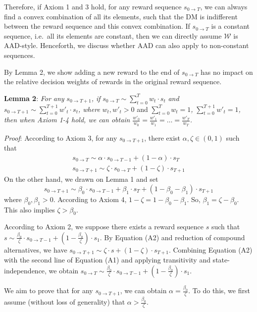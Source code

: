 \documentclass[
  12pt,
]{article}
\begin{document}
Therefore, if Axiom 1 and 3 hold, for any reward sequence
\(s_{0\rightarrow T}\), we can always find a convex combination of all
its elements, such that the DM is indifferent between the reward
sequence and this convex combination. If \(s_{0\rightarrow T}\) is a
constant sequence, i.e.~all its elements are constant, then we can
directly assume \(\mathcal{W}\) is AAD-style. Henceforth, we discuss
whether AAD can also apply to non-constant sequences.

By Lemma 2, we show adding a new reward to the end of
\(s_{0\rightarrow T}\) has no impact on the relative decision weights of
rewards in the original reward sequence.

\noindent \textbf{Lemma 2}: \emph{For any}
\(s_{0\rightarrow T+1}\)\emph{, if}
\(s_{0\rightarrow T}\sim \sum_{t=0}^T w_t \cdot s_t\) \emph{and}
\(s_{0\rightarrow T+1} \sim \sum_{t=0}^{T+1} w'_t\cdot s_t\)\emph{,
where} \(w_t, w'_t>0\) and \(\sum_{t=0}^Tw_t=1\)\emph{,}
\(\sum_{t=0}^{T+1}w'_t=1\)\emph{, then when Axiom 1-4 hold, we can
obtain} \(\frac{w'_0}{w_0}=\frac{w'_1}{w_1}=…=\frac{w'_T}{w_T}\)\emph{.}

\noindent \emph{Proof}: According to Axiom 3, for any
\(s_{0\rightarrow T+1}\), there exist \(\alpha,\zeta \in (0,1)\) such
that\[\tag{A1}
\begin{aligned}
s_{0 \rightarrow T}\sim\alpha\cdot s_{0 \rightarrow T-1} + (1-\alpha)\cdot s_T \\
s_{0\rightarrow T+1} \sim \zeta\cdot s_{0\rightarrow T} + (1-\zeta)\cdot s_{T+1}
\end{aligned}
\]On the other hand, we drawn on Lemma 1 and set\[\tag{A2}
s_{0\rightarrow T+1} \sim \beta_0\cdot s_{0 \rightarrow T-1} + \beta_1\cdot s_T + (1-\beta_0-\beta_1)\cdot s_{T+1}
\]where \(\beta_0, \beta_1 > 0\). According to Axiom 4,
\(1-\zeta=1-\beta_0-\beta_1\). So, \(\beta_1=\zeta-\beta_0\). This also
implies \(\zeta > \beta_0\).

According to Axiom 2, we suppose there exists a reward sequence \(s\)
such that
\(s \sim \frac{\beta_0}{\zeta}\cdot s_{0 \rightarrow T-1} + (1-\frac{\beta_0}{\zeta})\cdot s_1\).
By Equation (A2) and reduction of compound alternatives, we have
\(s_{0\rightarrow T+1}\sim \zeta \cdot s + (1-\zeta)\cdot s_{T+1}\).
Combining Equation (A2) with the second line of Equation (A1) and
applying transitivity and state-independence, we obtain
\(s_{0\rightarrow T} \sim \frac{\beta_0}{\zeta}\cdot s_{0 \rightarrow T-1} + (1-\frac{\beta_0}{\zeta})\cdot s_1\).

We aim to prove that for any \(s_{0\rightarrow T+1}\), we can obtain
\(\alpha=\frac{\beta_0}{\zeta}\). To do this, we first assume (without
loss of generality) that \(\alpha > \frac{\beta_0}{\zeta}\).
\end{document}
